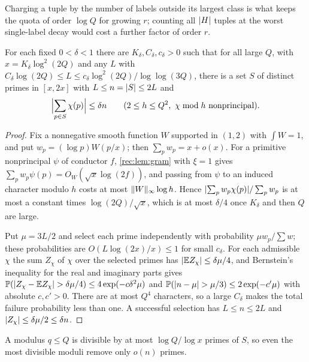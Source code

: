 Charging a tuple by the number of labels outside its largest class is what keeps the quota of
order $\log Q$ for growing $r$; counting all $\lvert H\rvert$ tuples at the worst single-label decay
would cost a further factor of order $r$.

\begin{lemma}\label{dir:lem:oneset}
For each fixed $0<\delta<1$ there are $K_\delta,C_\delta,c_\delta>0$ such that for all large $Q$,
with $x=K_\delta\log^2(2Q)$ and any $L$ with
$C_\delta\log(2Q)\le L\le c_\delta\log^2(2Q)/\log\log(3Q)$, there is a set $S$ of distinct primes
in $[x,2x]$ with $L\le n=\lvert S\rvert\le2L$ and
\[
 \Bigl|\sum_{p\in S}\chi(p)\Bigr|\le\delta n\qquad
 (2\le h\le Q^2,\ \chi\bmod h\text{ nonprincipal}).
\]
\end{lemma}

\begin{proof}
Fix a nonnegative smooth function $W$ supported in $(1,2)$ with $\int W=1$, and put
$w_p=(\log p)W(p/x)$; then $\sum_pw_p=x+o(x)$. For a primitive nonprincipal $\psi$ of conductor
$f$, \cref{rec:lem:gram} with $\xi=1$ gives $\sum_pw_p\psi(p)=O_W(\sqrt x\log(2f))$, and passing from $\psi$
to an induced character modulo $h$ costs at most $\lVert W\rVert_\infty\log h$. Hence
$\lvert\sum_pw_p\chi(p)\rvert/\sum_pw_p$ is at most a constant times $\log(2Q)/\sqrt x$, which is at most
$\delta/4$ once $K_\delta$ and then $Q$ are large.

Put $\mu=3L/2$ and select each prime independently with probability $\mu w_p/\sum w$; these
probabilities are $O(L\log(2x)/x)\le1$ for small $c_\delta$. For each admissible $\chi$ the sum
$Z_\chi$ of $\chi$ over the selected primes has $\lvert\mathbb{E} Z_\chi\rvert\le\delta\mu/4$, and
Bernstein's inequality for the real and imaginary parts gives
$\mathbb{P}(\lvert Z_\chi-\mathbb{E} Z_\chi\rvert>\delta\mu/4)\le4\exp(-c\delta^2\mu)$ and
$\mathbb{P}(\lvert n-\mu\rvert>\mu/3)\le2\exp(-c'\mu)$ with absolute $c,c'>0$. There are at most $Q^4$
characters, so a large $C_\delta$ makes the total failure probability less than one. A successful
selection has $L\le n\le2L$ and $\lvert Z_\chi\rvert\le\delta\mu/2\le\delta n$.
\end{proof}

A modulus $q\le Q$ is divisible by at most $\log Q/\log x$ primes of $S$, so even the most
divisible moduli remove only $o(n)$ primes.

